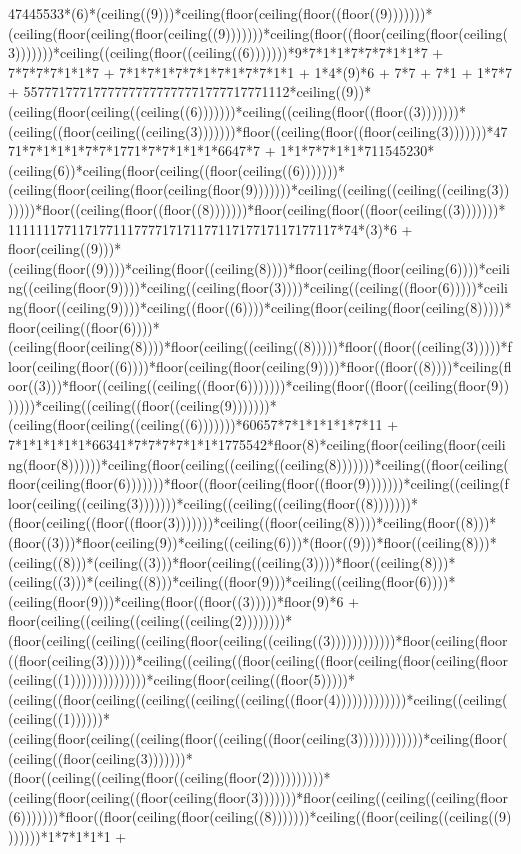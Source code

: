 47445533*(6)*(ceiling((9)))*ceiling(floor(ceiling(floor((floor((9)))))))*(ceiling(floor(ceiling(floor(ceiling((9)))))))*ceiling(floor((floor(ceiling(floor(ceiling(3)))))))*ceiling((ceiling(floor((ceiling((6)))))))*9*7*1*1*7*7*7*1*1*7 + 7*7*7*7*1*1*7 + 7*1*7*1*7*7*1*7*1*7*7*1*1 + 1*4*(9)*6 + 7*7 + 7*1 + 1*7*7 + 55777177717777777777777771777717771112*ceiling((9))*(ceiling(floor(ceiling((ceiling((6)))))))*ceiling((ceiling(floor((floor((3)))))))*(ceiling((floor(ceiling((ceiling(3)))))))*floor((ceiling(floor((floor(ceiling(3)))))))*4771*7*1*1*1*7*7*1771*7*7*1*1*1*6647*7 + 1*1*7*7*1*1*711545230*(ceiling(6))*ceiling(floor(ceiling((floor(ceiling((6)))))))*(ceiling(floor(ceiling(floor(ceiling(floor(9)))))))*ceiling((ceiling((ceiling((ceiling(3)))))))*floor((ceiling(floor((floor((8)))))))*floor(ceiling(floor((floor(ceiling((3)))))))*11111117711717711177771717117711717717117177117*74*(3)*6 + floor(ceiling((9)))*(ceiling(floor((9))))*ceiling(floor((ceiling(8))))*floor(ceiling(floor(ceiling(6))))*ceiling((ceiling(floor(9))))*ceiling((ceiling(floor(3))))*ceiling((ceiling((floor(6)))))*ceiling(floor((ceiling(9))))*ceiling((floor((6))))*ceiling(floor(ceiling(floor(ceiling(8)))))*floor(ceiling((floor(6))))*(ceiling(floor(ceiling(8))))*floor(ceiling((ceiling((8)))))*floor((floor((ceiling(3)))))*floor(ceiling(floor((6))))*floor(ceiling(floor(ceiling(9))))*floor((floor((8))))*ceiling(floor((3)))*floor((ceiling((ceiling((floor(6)))))))*ceiling(floor((floor((ceiling(floor(9)))))))*ceiling((ceiling((floor((ceiling(9)))))))*(ceiling(floor(ceiling((ceiling((6)))))))*60657*7*1*1*1*1*7*11 + 7*1*1*1*1*1*66341*7*7*7*7*1*1*1775542*floor(8)*ceiling(floor(ceiling(floor(ceiling(floor(8))))))*ceiling(floor(ceiling((ceiling((ceiling(8)))))))*ceiling((floor(ceiling(floor(ceiling(floor(6)))))))*floor((floor(ceiling(floor((floor(9)))))))*ceiling((ceiling(floor(ceiling((ceiling(3)))))))*ceiling((ceiling((ceiling(floor((8)))))))*(floor(ceiling((floor((floor(3)))))))*ceiling((floor(ceiling(8))))*ceiling(floor((8)))*(floor((3)))*floor(ceiling(9))*ceiling((ceiling(6)))*(floor((9)))*floor((ceiling(8)))*(ceiling((8)))*(ceiling((3)))*floor(ceiling((ceiling(3))))*floor((ceiling(8)))*(ceiling((3)))*(ceiling((8)))*ceiling((floor(9)))*ceiling((ceiling(floor(6))))*(ceiling(floor(9)))*ceiling(floor((floor((3)))))*floor(9)*6 + floor(ceiling((ceiling((ceiling((ceiling(2))))))))*(floor(ceiling((ceiling((ceiling(floor(ceiling((ceiling((3))))))))))))*floor(ceiling(floor((floor(ceiling(3))))))*ceiling((ceiling((floor(ceiling((floor(ceiling(floor(ceiling(floor(ceiling((1))))))))))))))*ceiling(floor(ceiling((floor(5)))))*(ceiling((floor(ceiling((ceiling((ceiling((ceiling((floor(4)))))))))))))*ceiling((ceiling((ceiling((1))))))*(ceiling(floor(ceiling((ceiling(floor((ceiling((floor(ceiling(3))))))))))))*ceiling(floor((ceiling((floor(ceiling(3)))))))*(floor((ceiling((ceiling(floor((ceiling(floor(2))))))))))*(ceiling(floor(ceiling((floor(ceiling(floor(3)))))))*floor(ceiling((ceiling((ceiling(floor(6)))))))*floor((floor(ceiling(floor(ceiling((8)))))))*ceiling((floor(ceiling((ceiling((9)))))))*1*7*1*1*1 + 